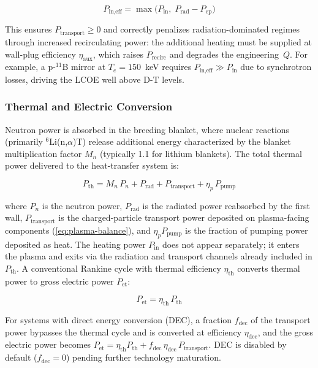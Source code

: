 \documentclass{article}
\begin{document}
\begin{equation}
\label{eq:p-input-eff}
P_{\text{in,eff}} = \max\!\bigl(P_{\text{in}},\;
  P_{\text{rad}} - P_{\text{cp}}\bigr)
\end{equation}

\noindent This ensures $P_{\text{transport}} \geq 0$ and correctly
penalizes radiation-dominated regimes through increased recirculating
power: the additional heating must be supplied at wall-plug efficiency
$\eta_{\text{aux}}$, which raises $P_{\text{recirc}}$ and degrades the
engineering~$Q$. For example, a p-${}^{11}$B mirror at
$T_e = 150$~keV requires $P_{\text{in,eff}} \gg P_{\text{in}}$ due to
synchrotron losses, driving the LCOE well above D-T levels.

\subsubsection{Thermal and Electric Conversion}

Neutron power is absorbed in the breeding blanket, where nuclear
reactions (primarily ${}^6$Li(n,$\alpha$)T) release additional energy
characterized by the blanket multiplication factor $M_n$ (typically
1.1 for lithium blankets). The total thermal power delivered to the
heat-transfer system is:

\begin{equation}
\label{eq:p-thermal}
P_{\text{th}} = M_n \, P_n + P_{\text{rad}} + P_{\text{transport}}
              + \eta_p \, P_{\text{pump}}
\end{equation}

\noindent where $P_n$ is the neutron power, $P_{\text{rad}}$ is the
radiated power reabsorbed by the first wall, $P_{\text{transport}}$ is the
charged-particle transport power deposited on plasma-facing components
(\cref{eq:plasma-balance}), and $\eta_p P_{\text{pump}}$ is the fraction
of pumping power deposited as heat. The heating power $P_{\text{in}}$ does not appear
separately; it enters the plasma and exits via the radiation and
transport channels already included in $P_{\text{th}}$.
A conventional Rankine cycle with thermal efficiency $\eta_{\text{th}}$
converts thermal power to gross electric power $P_{\text{et}}$:

\begin{equation}
\label{eq:p-gross}
P_{\text{et}} = \eta_{\text{th}} \, P_{\text{th}}
\end{equation}

\noindent For systems with direct energy conversion (DEC), a fraction
$f_{\text{dec}}$ of the transport power bypasses the
thermal cycle and is converted at efficiency $\eta_{\text{dec}}$, and
the gross electric power becomes
$P_{\text{et}} = \eta_{\text{th}} P_{\text{th}} +
 f_{\text{dec}} \, \eta_{\text{dec}} \, P_{\text{transport}}$.
DEC is disabled by default ($f_{\text{dec}} = 0$) pending further
technology maturation.
\end{document}
